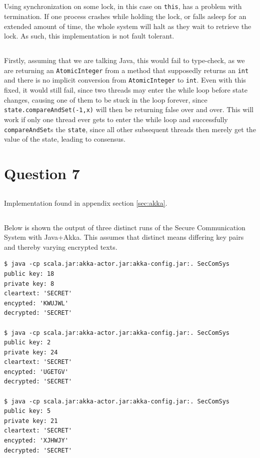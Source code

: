 \documentclass[a5paper]{article}
\begin{document}
\subsection{}
Using synchronization on some lock, in this case on \texttt{this}, has a problem with termination. If one process crashes while holding the lock, or falls asleep for an extended amount of time,
the whole system will halt as they wait to retrieve the lock. As such, this implementation is not fault tolerant.

\subsection{}
Firstly, assuming that we are talking Java, this would fail to type-check, as we are returning an \texttt{AtomicInteger} from a method that supposedly returns an \texttt{int} and there is no implicit conversion from \texttt{AtomicInteger} to \texttt{int}. Even with this fixed, it would still fail, since two threads may enter the while loop before state changes, causing one of them to be stuck in the loop forever, since \texttt{state.compareAndSet(-1,x)} will then be returning false over and over. This will work if only one thread ever gets to enter the while loop and successfully \texttt{compareAndSet}s the \texttt{state}, since all other subsequent threads then merely get the value of the state, leading to consensus.

\section{Question 7}
\subsection{}
Implementation found in appendix section \ref{sec:akka}.

\subsection{}
Below is shown the output of three distinct runs of the Secure Communication System with Java+Akka.
This assumes that distinct means differing key pairs and thereby varying encrypted texts.
\begin{verbatim}
$ java -cp scala.jar:akka-actor.jar:akka-config.jar:. SecComSys
public key: 18
private key: 8
cleartext: 'SECRET'
encypted: 'KWUJWL'
decrypted: 'SECRET'

$ java -cp scala.jar:akka-actor.jar:akka-config.jar:. SecComSys
public key: 2
private key: 24
cleartext: 'SECRET'
encypted: 'UGETGV'
decrypted: 'SECRET'

$ java -cp scala.jar:akka-actor.jar:akka-config.jar:. SecComSys
public key: 5
private key: 21
cleartext: 'SECRET'
encypted: 'XJHWJY'
decrypted: 'SECRET'
\end{verbatim}
\end{document}
